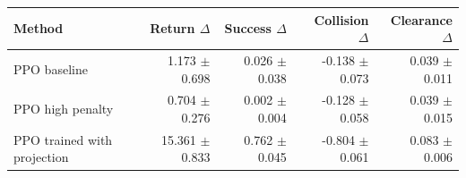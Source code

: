 \begin{tabular}{lrrrr}
\toprule
Method & Return $\Delta$ & Success $\Delta$ & Collision $\Delta$ & Clearance $\Delta$ \\
\midrule
PPO baseline & 1.173 $\pm$ 0.698 & 0.026 $\pm$ 0.038 & -0.138 $\pm$ 0.073 & 0.039 $\pm$ 0.011 \\
PPO high penalty & 0.704 $\pm$ 0.276 & 0.002 $\pm$ 0.004 & -0.128 $\pm$ 0.058 & 0.039 $\pm$ 0.015 \\
PPO trained with projection & 15.361 $\pm$ 0.833 & 0.762 $\pm$ 0.045 & -0.804 $\pm$ 0.061 & 0.083 $\pm$ 0.006 \\
\bottomrule
\end{tabular}
